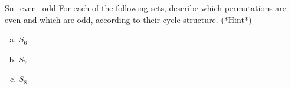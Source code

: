 
\begin{exercise}{Sn_even_odd}
For each of the following sets, describe which permutations are even and which are odd, according to their cycle structure.
\hyperref[sec:Permutations:Hints]{(*Hint*)}
\begin{multicols}{3}
\begin{enumerate}[(a)]
\item
$S_6$
\item
$S_7$
\item
$S_8$
\end{enumerate}
\end{multicols}
\end{exercise}

